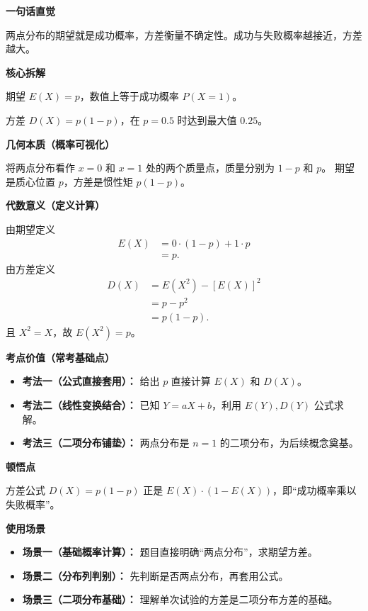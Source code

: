 \begin{explanationbox}

	\textbf{\textcolor{CExplanation}{一句话直觉}}

	两点分布的期望就是成功概率，方差衡量不确定性。成功与失败概率越接近，方差越大。

	\medskip
	\textbf{\textcolor{CExplanation}{核心拆解}}
	\begin{description}[style=nextline, leftmargin=2.8em, labelsep=0.5em, itemsep=0.45em]
		\item[\textbf{要点一（概率等于期望）：}] 期望 $E(X)=p$，数值上等于成功概率 $P(X=1)$。
		\item[\textbf{要点二（方差波动范围）：}] 方差 $D(X)=p(1-p)$，在 $p=0.5$ 时达到最大值 $0.25$。
	\end{description}

	\medskip
	\textbf{\textcolor{CExplanation}{几何本质（概率可视化）}}

	将两点分布看作 $x=0$ 和 $x=1$ 处的两个质量点，质量分别为 $1-p$ 和 $p$。
	期望是质心位置 $p$，方差是惯性矩 $p(1-p)$。

	\medskip
	\textbf{\textcolor{CExplanation}{代数意义（定义计算）}}

	由期望定义
	\[
		\begin{aligned}
			E(X) &= 0\cdot (1-p) + 1\cdot p \\
			&= p.
		\end{aligned}
	\]
	由方差定义
	\[
		\begin{aligned}
			D(X) &= E(X^2) - [E(X)]^2 \\
			&= p - p^2 \\
			&= p(1-p).
		\end{aligned}
	\]
	且 $X^2 = X$，故 $E(X^2)=p$。

	\medskip
	\textbf{\textcolor{CExplanation}{考点价值（常考基础点）}}
	\begin{itemize}[leftmargin=*, itemsep=0.5em, topsep=0.4em]
		\item \textbf{考法一（公式直接套用）：} 给出 $p$ 直接计算 $E(X)$ 和 $D(X)$。
		\item \textbf{考法二（线性变换结合）：} 已知 $Y=aX+b$，利用 $E(Y),D(Y)$ 公式求解。
		\item \textbf{考法三（二项分布铺垫）：} 两点分布是 $n=1$ 的二项分布，为后续概念奠基。
	\end{itemize}

	\medskip
	\textbf{\textcolor{CExplanation}{顿悟点}}

	方差公式 $D(X)=p(1-p)$ 正是 $E(X)\cdot(1-E(X))$，即“成功概率乘以失败概率”。

	\medskip
	\textbf{\textcolor{CExplanation}{使用场景}}
	\begin{itemize}[leftmargin=*, itemsep=0.5em, topsep=0.4em]
		\item \textbf{场景一（基础概率计算）：} 题目直接明确“两点分布”，求期望方差。
		\item \textbf{场景二（分布列判别）：} 先判断是否两点分布，再套用公式。
		\item \textbf{场景三（二项分布基础）：} 理解单次试验的方差是二项分布方差的基础。
	\end{itemize}
\end{explanationbox}
